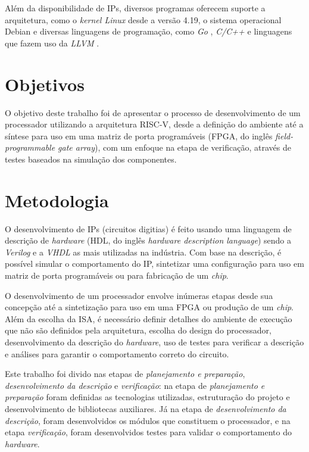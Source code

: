 Além da disponibilidade de IPs, diversos
programas oferecem suporte a arquitetura, como o \emph{kernel Linux} desde a versão 4.19, o
sistema operacional Debian \citep{RVDB} e diversas
linguagens de programação, como \emph{Go} \citep{GOL}, \emph{C/C++} \citep{RVGCC} e
linguagens que fazem uso da \emph{LLVM} \citep{RVLLVM}.

\section{Objetivos}
\label{sec:io}

O objetivo deste trabalho foi de apresentar o processo de desenvolvimento de um processador 
utilizando a arquitetura RISC-V, desde a definição do ambiente até a síntese para uso em uma 
matriz de porta programáveis (FPGA, do inglês \emph{field-programmable gate array}), com um enfoque na etapa de verificação,
através de testes baseados na simulação dos componentes.

\section{Metodologia}
\label{sec:im}

O desenvolvimento de IPs (circuitos digitias) é feito usando uma linguagem de descrição de \emph{hardware} 
(HDL, do inglês \emph{hardware description language}) sendo a \emph{Verilog} e a 
\emph{VHDL} as mais utilizadas na indústria. Com base na descrição, é possível 
simular o comportamento do IP, sintetizar uma configuração para uso em 
matriz de porta programáveis ou para fabricação de um \emph{chip}.

O desenvolvimento de um processador envolve inúmeras etapas desde sua concepção até a sintetização para
uso em uma FPGA ou produção de um \emph{chip}. 
Além da escolha da ISA, é necessário definir detalhes do ambiente 
de execução que não são definidos pela arquitetura, escolha do design do processador, desenvolvimento da 
descrição do \emph{hardware}, uso de testes para verificar a descrição e análises para garantir o comportamento
correto do circuito.

Este trabalho foi divido nas etapas de \emph{planejamento e preparação}, 
\emph{desenvolvimento da descrição} e \emph{verificação}:
na etapa de \emph{planejamento e preparação} foram definidas as tecnologias utilizadas,
estruturação do projeto e desenvolvimento de bibliotecas auxiliares. Já
na etapa de \emph{desenvolvimento da descrição}, foram desenvolvidos os módulos que constituem o
processador, e na etapa
\emph{verificação}, foram desenvolvidos testes para validar o comportamento do \emph{hardware}.

